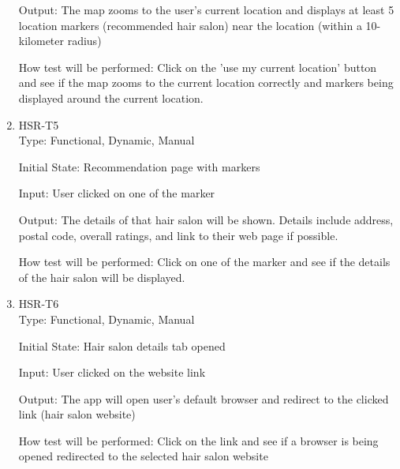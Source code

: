 \documentclass[12pt, titlepage]{article}
\begin{document}
\begin{enumerate}
Output: The map zooms to the user's current location and displays at least 5 location markers (recommended hair salon) near the location (within a 10-kilometer radius)
					
How test will be performed: Click on the 'use my current location' button and see if the map zooms to the current location correctly and markers being displayed around the current location.

\item{HSR-T5}\\
Type: Functional, Dynamic, Manual
					
Initial State: Recommendation page with markers
					
Input: User clicked on one of the marker
					
Output: The details of that hair salon will be shown. Details include address, postal code, overall ratings, and link to their web page if possible.
					
How test will be performed: Click on one of the marker and see if the details of the hair salon will be displayed.

\item{HSR-T6}\\
Type: Functional, Dynamic, Manual
					
Initial State: Hair salon details tab opened
					
Input: User clicked on the website link
					
Output: The app will open user's default browser and redirect to the clicked link (hair salon website)
					
How test will be performed: Click on the link and see if a browser is being opened redirected to the selected hair salon website
\end{enumerate}
\end{document}
